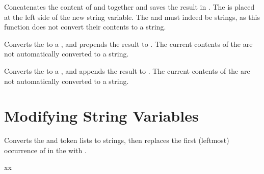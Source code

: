 \documentclass[oneside]{book}
\begin{document}
\begin{function}{\strConcat}
\begin{syntax}
   
\end{syntax}
Concatenates the content of  and 
together and saves the result in . The 
is placed at the left side of the new string variable.
The  and  must indeed be strings, as
this function does not convert their contents to a string.
\begin{demohigh}
\strSet {}
\strSet {}
\strConcat \lTmpaStr \lTmpbStr \lTmpcStr
\strUse \lTmpaStr
\end{demohigh}
\end{function}

\begin{function}{\strPutLeft}
\begin{syntax}
  
\end{syntax}
Converts the  to a , and prepends the
result to .  The current contents of the  are not automatically converted to a string.
\begin{demohigh}
\strSet {}
\strPutLeft {}
\strUse \lTmpkStr
\end{demohigh}
\end{function}

\begin{function}{\strPutRight}
\begin{syntax}
  
\end{syntax}
Converts the  to a , and appends the
result to .  The current contents of the  are not automatically converted to a string.
\begin{demohigh}
\strSet {}
\strPutRight {}
\strUse \lTmpkStr
\end{demohigh}
\end{function}

\section{Modifying String Variables}

\begin{function}{\strVarReplaceOnce}
\begin{syntax}
   
\end{syntax}
Converts the  and  token lists to strings, then
replaces the first (leftmost) occurrence of  in the
 with .
\begin{demohigh}
\strSet {}
\strVarReplaceOnce {} {xx}
\strUse \lTmpaStr
\end{demohigh}
\end{function}
\end{document}
